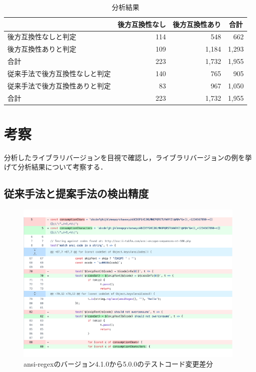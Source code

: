 \documentclass[11pt,dvipdfmx]{jreport}
\begin{document}
\begin{table}[t]
  \centering
  \caption{分析結果}
  \label{fig:result}
  \begin{tabular}{l|r|r|r}
    \hline
                    & \multicolumn{1}{c|}{後方互換性なし} & \multicolumn{1}{c|}{後方互換性あり} & \multicolumn{1}{c}{合計} \\ \hline
    後方互換性なしと判定      & 114                          & 548                          & 662                    \\ \hline
    後方互換性ありと判定      & 109                          & 1,184                        & 1,293                  \\ \hline
    合計              & 223                          & 1,732                        & 1,955                  \\ \hline\hline
    従来手法で後方互換性なしと判定 & 140                          & 765                          & 905                    \\ \hline
    従来手法で後方互換性ありと判定 & 83                           & 967                          & 1,050                  \\ \hline
    合計              & 223                          & 1,732                        & 1,955                  \\ \hline
  \end{tabular}
\end{table}


\section{考察}\label{rq2:kousatu}

分析したライブラリバージョンを目視で確認し，ライブラリバージョンの例を挙げて分析結果について考察する．

\subsection{従来手法と提案手法の検出精度}

\begin{figure}[t]
  \centering
  \includegraphics[width=1.0\linewidth]{fig/rq2/ansi-regex.pdf}
  \caption{ansi-regexのバージョン4.1.0から5.0.0のテストコード変更差分}
  \label{fig:rq2.ansi-regex}
\end{figure}
\end{document}
